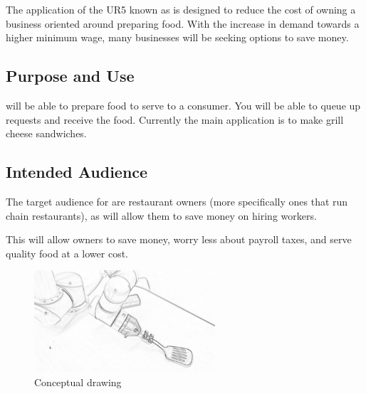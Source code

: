 The application of the UR5 known as \productname{} is designed to reduce the cost of owning a business oriented around preparing food. With the increase in demand towards a higher minimum wage, many businesses will be seeking options to save money.

\subsection{Purpose and Use}
\productname{} will be able to prepare food to serve to a consumer. You will be able to queue up requests and receive the food.  Currently the main application is to make grill cheese sandwiches.

\subsection{Intended Audience}
The target audience for \productname{} are restaurant owners (more specifically ones that run chain restaurants), as \productname{} will allow them to save money on hiring workers.

This will allow owners to save money, worry less about payroll taxes, and serve quality food at a lower cost.

\begin{figure}[h!]
	\centering
   	\includegraphics[width=0.60\textwidth]{images/test_image}
    \caption{Conceptual drawing}
\end{figure}
